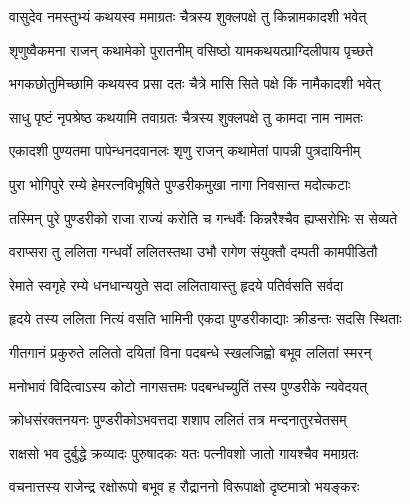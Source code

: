 \hyperref[sec:ekadashi_mahatmyam_vrata_raja]{\closesub}
\clearpage

\label{sec:vrata-raja-chaitra-shukla-kamada}


\twolineshloka
{वासुदेव नमस्तुभ्यं कथयस्व ममाग्रतः}
{चैत्रस्य शुक्लपक्षे तु किन्नामकादशी भवेत्} %


\twolineshloka
{शृणुष्वैकमना राजन् कथामेको पुरातनीम्}
{वसिष्ठो यामकथयत्प्राग्दिलीपाय पृच्छते} %


\twolineshloka
{भगकछोतुमिच्छामि कथयस्व प्रसा दतः}
{चैत्रे मासि सिते पक्षे किं नामैकादशी भवेत्} %


\twolineshloka
{साधु पृष्टं नृपश्रेष्ठ कथयामि तवाग्रतः}
{चैत्रस्य शुक्लपक्षे तु कामदा नाम नामतः} %

\twolineshloka
{एकादशी पुण्यतमा पापेन्धनदवानलः}
{शृणु राजन् कथामेतां पापन्नी पुत्रदायिनीम्} %

\twolineshloka
{पुरा भोगिपुरे रम्ये हेमरत्नविभूषिते}
{पुण्डरीकमुखा नागा निवसान्त मदोत्कटाः} %

\twolineshloka
{तस्मिन् पुरे पुण्डरीको राजा राज्यं करोति च}
{गन्धर्वैः किन्नरैश्चैव ह्यप्सरोभिः स सेव्यते} %

\twolineshloka
{वराप्सरा तु ललिता गन्धर्वो ललितस्तथा}
{उभौ रागेण संयुक्तौ दम्पती कामपीडितौ} %

\twolineshloka
{रेमाते स्वगृहे रम्ये धनधान्ययुते सदा}
{ललितायास्तु हृदये पतिर्वसति सर्वदा} %

\twolineshloka
{हृदये तस्य ललिता नित्यं वसति भामिनी}
{एकदा पुण्डरीकाद्याः क्रीडन्तः सदसि स्थिताः} %

\twolineshloka
{गीतगानं प्रकुरुते ललितो दयितां विना}
{पदबन्धे स्खलजिह्वो बभूव ललितां स्मरन्} %

\twolineshloka
{मनोभावं विदित्वाऽस्य कोटो नागसत्तमः}
{पदबन्धच्युतिं तस्य पुण्डरीके न्यवेदयत्} %

\twolineshloka
{क्रोधसंरक्तनयनः पुण्डरीकोऽभवत्तदा}
{शशाप ललितं तत्र मन्दनातुरचेतसम्} %

\twolineshloka
{राक्षसो भव दुर्बुद्धे क्रव्यादः पुरुषादकः}
{यतः पत्नीवशो जातो गायश्चैव ममाग्रतः} %

\twolineshloka
{वचनात्तस्य राजेन्द्र रक्षोरूपो बभूव ह}
{रौद्राननो विरूपाक्षो दृष्टमात्रो भयङ्करः} %


